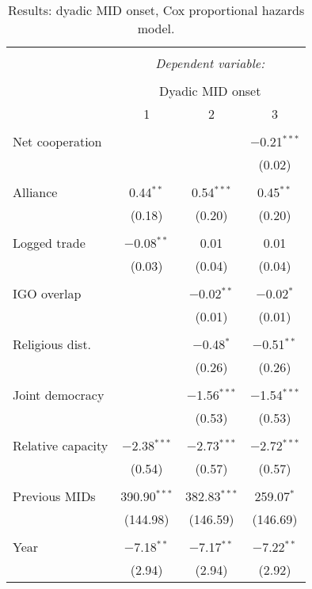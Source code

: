 \documentclass[10pt,]{article}
\begin{document}
\begin{table}[!htbp] \centering 
  \caption{\label{tab:MidCoxPH}Results: dyadic MID onset, Cox proportional hazards model.} 
  \label{} 
\begin{tabular}{@{\extracolsep{5pt}}lccc} 
\\[-1.8ex]\hline 
\hline \\[-1.8ex] 
 & \multicolumn{3}{c}{\textit{Dependent variable:}} \\ 
\cline{2-4} 
\\[-1.8ex] & \multicolumn{3}{c}{Dyadic MID onset} \\ 
 & 1 & 2 & 3 \\ 
\hline \\[-1.8ex] 
 Net cooperation &  &  & $-$0.21$^{***}$ \\ 
  &  &  & (0.02) \\ 
  & & & \\ 
 Alliance & 0.44$^{**}$ & 0.54$^{***}$ & 0.45$^{**}$ \\ 
  & (0.18) & (0.20) & (0.20) \\ 
  & & & \\ 
 Logged trade & $-$0.08$^{**}$ & 0.01 & 0.01 \\ 
  & (0.03) & (0.04) & (0.04) \\ 
  & & & \\ 
 IGO overlap &  & $-$0.02$^{**}$ & $-$0.02$^{*}$ \\ 
  &  & (0.01) & (0.01) \\ 
  & & & \\ 
 Religious dist. &  & $-$0.48$^{*}$ & $-$0.51$^{**}$ \\ 
  &  & (0.26) & (0.26) \\ 
  & & & \\ 
 Joint democracy &  & $-$1.56$^{***}$ & $-$1.54$^{***}$ \\ 
  &  & (0.53) & (0.53) \\ 
  & & & \\ 
 Relative capacity & $-$2.38$^{***}$ & $-$2.73$^{***}$ & $-$2.72$^{***}$ \\ 
  & (0.54) & (0.57) & (0.57) \\ 
  & & & \\ 
 Previous MIDs & 390.90$^{***}$ & 382.83$^{***}$ & 259.07$^{*}$ \\ 
  & (144.98) & (146.59) & (146.69) \\ 
  & & & \\ 
 Year & $-$7.18$^{**}$ & $-$7.17$^{**}$ & $-$7.22$^{**}$ \\ 
  & (2.94) & (2.94) & (2.92) \\ 

\end{tabular}
\end{table}
\end{document}
